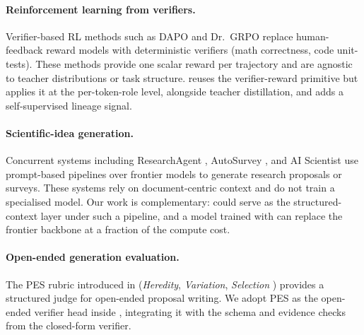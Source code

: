 \paragraph{Reinforcement learning from verifiers.} Verifier-based RL
methods such as DAPO \citep{dapo2025} and Dr.~GRPO \citep{drgrpo2025}
replace human-feedback reward models with deterministic verifiers (math
correctness, code unit-tests). These methods provide one scalar reward per
trajectory and are agnostic to teacher distributions or task structure.
\evoopd{} reuses the verifier-reward primitive but applies it at the
per-token-role level, alongside teacher distillation, and adds a
self-supervised lineage signal.

\paragraph{Scientific-idea generation.} Concurrent systems including
ResearchAgent , AutoSurvey , and AI Scientist
 use prompt-based pipelines over frontier models to generate
research proposals or surveys. These systems rely on document-centric
context and do not train a specialised model. Our work is complementary:
\genetrace{} could serve as the structured-context layer under such a
pipeline, and a model trained with \evoopd{} can replace the frontier
backbone at a fraction of the compute cost.

\paragraph{Open-ended generation evaluation.} The PES rubric introduced in
\ideaevolving{} (\textit{Heredity}, \textit{Variation}, \textit{Selection}
\citep{ideaevolving2025}) provides a structured judge for open-ended
proposal writing. We adopt PES as the open-ended verifier head inside
\evoopd, integrating it with the schema and evidence checks from the
closed-form verifier.
